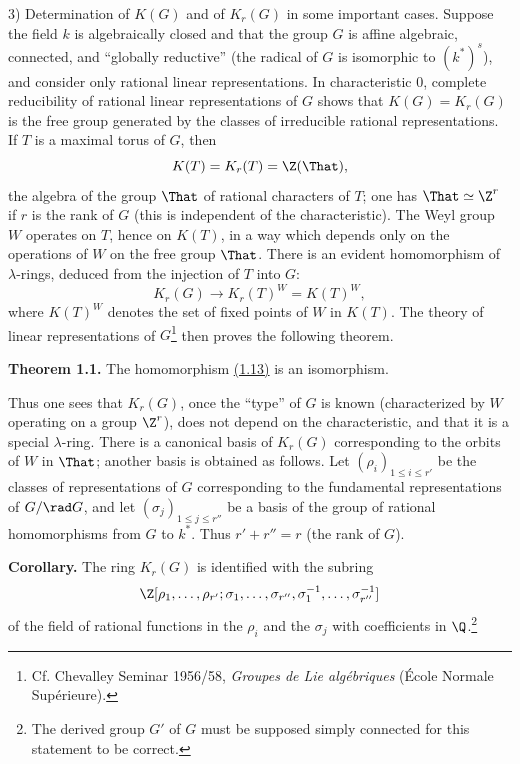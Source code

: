 3) Determination of $K(G)$ and of $K_r(G)$ in some important cases. Suppose the field $k$ is algebraically closed and that the group $G$ is affine algebraic, connected, and ``globally reductive'' (the radical of $G$ is isomorphic to $(k^*)^s$), and consider only rational linear representations. In characteristic $0$, complete reducibility of rational linear representations of $G$ shows that $K(G)=K_r(G)$ is the free group generated by the classes of irreducible rational representations. If $T$ is a maximal torus of $G$, then
\[
K(T)=K_r(T)=\Z(\That),
\]
the algebra of the group $\That$ of rational characters of $T$; one has $\That\simeq \Z^r$ if $r$ is the rank of $G$ (this is independent of the characteristic). The Weyl group $W$ operates on $T$, hence on $K(T)$, in a way which depends only on the operations of $W$ on the free group $\That$. There is an evident homomorphism of $\lambda$-rings, deduced from the injection of $T$ into $G$:
\begin{equation}\tag{1.13}
K_r(G)\longrightarrow K_r(T)^W=K(T)^W,
\end{equation}
where $K(T)^W$ denotes the set of fixed points of $W$ in $K(T)$. The theory of linear representations of $G$\footnote{Cf. Chevalley Seminar 1956/58, \emph{Groupes de Lie algébriques} (École Normale Supérieure).} then proves the following theorem.

\textbf{Theorem 1.1.} The homomorphism \hyperlink{sga6.e00.eq.1-13}{(1.13)} is an isomorphism.

Thus one sees that $K_r(G)$, once the ``type'' of $G$ is known (characterized by $W$ operating on a group $\Z^r$), does not depend on the characteristic, and that it is a special $\lambda$-ring. There is a canonical basis of $K_r(G)$ corresponding to the orbits of $W$ in $\That$; another basis is obtained as follows. Let $(\rho_i)_{1\leq i\leq r'}$ be the classes of representations of $G$ corresponding to the fundamental representations of $G/\rad G$, and let $(\sigma_j)_{1\leq j\leq r''}$ be a basis of the group of rational homomorphisms from $G$ to $k^*$. Thus $r'+r''=r$ (the rank of $G$).

\textbf{Corollary.} The ring $K_r(G)$ is identified with the subring
\[
\Z[\rho_1,\ldots,\rho_{r'};\sigma_1,\ldots,\sigma_{r''},\sigma_1^{-1},\ldots,\sigma_{r''}^{-1}]
\]
of the field of rational functions in the $\rho_i$ and the $\sigma_j$ with coefficients in $\Q$.\footnote{The derived group $G'$ of $G$ must be supposed simply connected for this statement to be correct.}

